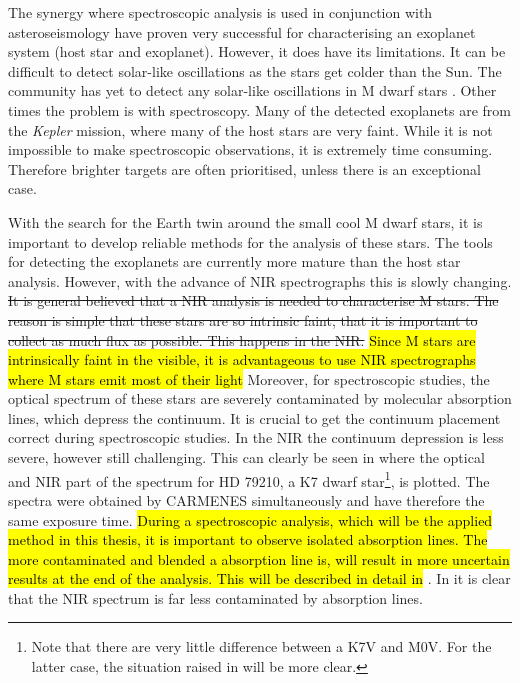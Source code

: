 The synergy where spectroscopic analysis is used in conjunction with asteroseismology have proven
very successful \citep[see e.g.][]{Huber2013} for characterising an exoplanet system (host star and
exoplanet). However, it does have its limitations. It can be difficult to detect solar-like
oscillations as the stars get colder than the Sun. The community has yet to detect any solar-like
oscillations in M dwarf stars \citep{Rodriguez2016,Berdinas2017}. Other times the problem is with
spectroscopy. Many of the detected exoplanets are from the \emph{Kepler} mission, where many of the
host stars are very faint. While it is not impossible to make spectroscopic observations, it is
extremely time consuming. Therefore brighter targets are often prioritised, unless there is an
exceptional case.

With the search for the Earth twin around the small cool M dwarf stars, it is important to develop
reliable methods for the analysis of these stars. The tools for detecting the exoplanets are
currently more mature than the host star analysis. However, with the advance of NIR spectrographs
this is slowly changing. \st{It is general believed that a NIR analysis is needed to characterise M
stars. The reason is simple that these stars are so intrinsic faint, that it is important to collect
as much flux as possible. This happens in the NIR.} \hl{Since M stars are intrinsically faint in the
visible, it is advantageous to use NIR spectrographs where M stars emit most of their light}
Moreover, for spectroscopic studies, the optical spectrum of these stars are severely contaminated
by molecular absorption lines, which depress the continuum. It is crucial to get the continuum
placement correct during spectroscopic studies. In the NIR the continuum depression is less severe,
however still challenging. This can clearly be seen in  where the optical and
NIR part of the spectrum for HD 79210, a K7 dwarf star\footnote{Note that there are very little
difference between a K7V and M0V. For the latter case, the situation raised in
 will be more clear.}, is plotted. The spectra were obtained by CARMENES
simultaneously and have therefore the same exposure time. \hl{During a spectroscopic analysis, which
will be the applied method in this thesis, it is important to observe isolated absorption lines. The
more contaminated and blended a absorption line is, will result in more uncertain results at the end
of the analysis. This will be described in detail in} . In
 it is clear that the NIR spectrum is far less contaminated by absorption
lines.

